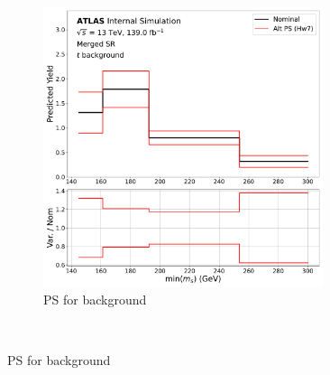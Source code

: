 \begin{figure}
\begin{subfigure}{0.45\textwidth}
    \includegraphics[width=0.9\textwidth]{Figures/6/2pt_PhHw7_syst_ttbar_SR_mgd_TARJets10_minmS_mgd_yield.pdf}
    \caption{PS for \ttbar background}\label{fig:ttbar_PS}
  \end{subfigure} \\ \vspace{1em}


\end{figure}
